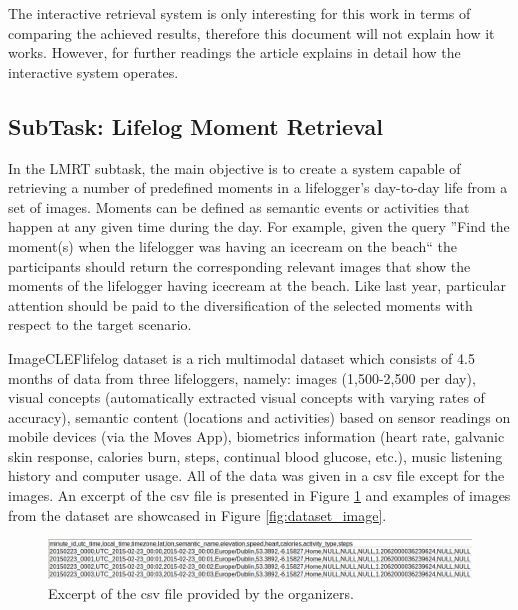 The interactive retrieval system is only interesting for this work in terms of comparing the achieved results, therefore this document will not explain how it works. However, for further readings the article \cite{Ribeiro2020} explains in detail how the interactive system operates.

    \subsection{SubTask: Lifelog Moment Retrieval}
    In the LMRT subtask, the main objective is to create a system capable of retrieving a number of predefined moments in a lifelogger’s day-to-day life from a set of images. Moments can be defined as semantic events or activities that happen at any given time during the day. For example, given the query ”Find the moment(s) when the lifelogger was having an icecream on the beach“ the participants should return the corresponding relevant images that show the moments of the lifelogger having icecream at the beach. Like last year, particular attention should be paid to the diversification of the selected moments with respect to the target scenario.

    ImageCLEFlifelog dataset is a rich multimodal dataset which consists of 4.5 months of data from three lifeloggers, namely: images (1,500-2,500 per day), visual concepts (automatically extracted visual concepts with varying rates of accuracy), semantic content (locations and activities) based on sensor readings on mobile devices (via the Moves App), biometrics information (heart rate, galvanic skin response, calories burn, steps, continual blood glucose, etc.), music listening history and computer usage. 
    All of the data was given in a csv file except for the images. An excerpt of the csv file is presented in Figure \ref{fig:dataset_csv} and examples of images from the dataset are showcased in Figure \ref{fig:dataset_image}.

    \begin{figure}[htb]
        
        \centering
 
        \captionsetup{justification=centering}
        \includegraphics[width =  \textwidth]{Sections/5ImageClef/images/dataset.png}
        \caption{Excerpt of the csv file provided by the organizers.}  
       \label{fig:dataset_csv}
    \end{figure}



